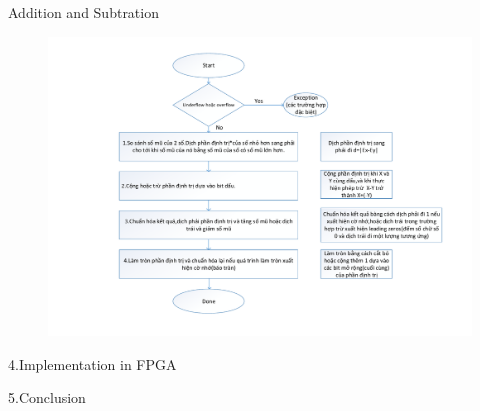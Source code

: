\documentclass[11pt]{beamer}
\begin{document}
\begin{frame}[t]{Addition and Subtration}
    \begin{figure}[htp]
    \begin{center}
     \includegraphics[scale=.37]{image/pesucodeadd}
    \end{center}
    \label{refpesucodeadd}
    \end{figure}
\end{frame}
\begin{frame}[t]{4.Implementation in FPGA}

\end{frame}
\begin{frame}[t]{5.Conclusion}

\end{frame}
\end{document}
